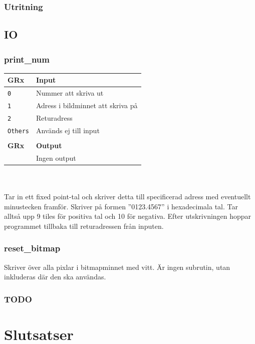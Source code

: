 \documentclass[]{article}
\begin{document}
\subsubsection{Utritning}

\subsection{IO}
\subsubsection{print\_num}
\begin{tabular}{ll}
	\textbf{GRx}    & \textbf{Input}                    \\ \hline
	\texttt{0}      & Nummer att skriva ut              \\
	\texttt{1}      & Adress i bildminnet att skriva på \\
	\texttt{2}      & Returadress                       \\
	\texttt{Others} & Används ej till input             \\
	                &  \\
	\textbf{GRx}    & \textbf{Output}                   \\ \hline
	                & Ingen output 						\\
\end{tabular}
\\\\
\noindent
Tar in ett fixed point-tal och skriver detta till specificerad adress med eventuellt minustecken framför. Skriver på formen ''0123.4567'' i hexadecimala tal. Tar alltså upp 9 tiles för positiva tal och 10 för negativa. Efter utskrivningen hoppar programmet tillbaka till returadressen från inputen.

\subsubsection{reset\_bitmap}
Skriver över alla pixlar i bitmapminnet med vitt. Är ingen subrutin, utan inkluderas där den ska användas.

\subsubsection{TODO}

\section{Slutsatser}
\end{document}
